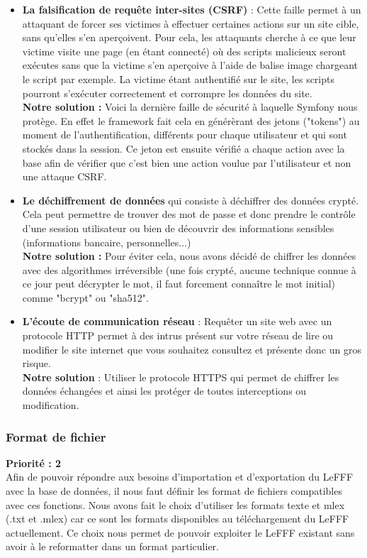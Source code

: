 \documentclass[12pt,a4paper]{article}
\begin{document}
\begin{itemize}
    \item \textbf{La falsification de requête inter-sites (CSRF)} : Cette faille permet à un attaquant de forcer ses victimes à effectuer certaines actions sur un site cible, sans qu'elles s'en aperçoivent. Pour cela, les attaquants cherche à ce que leur victime visite une page (en étant connecté) où des scripts malicieux seront exécutes sans que la victime s'en aperçoive à l'aide de balise image chargeant le script par exemple. La victime étant authentifié sur le site, les scripts pourront s'exécuter correctement et corrompre les données du site. \\
    \textbf{Notre solution :} Voici la dernière faille de sécurité à laquelle Symfony nous protège. En effet le framework fait cela en générèrant des jetons ("tokens") au moment de l'authentification, différents pour chaque utilisateur et qui sont stockés dans la session. Ce jeton est ensuite vérifié a chaque action avec la base afin de vérifier que c'est bien une action voulue par l'utilisateur et non une attaque CSRF. 
    \item \textbf{Le déchiffrement de données} qui consiste à déchiffrer des données crypté. Cela peut permettre de trouver des mot de passe et donc prendre le contrôle d'une session utilisateur ou bien de découvrir des informations sensibles (informations bancaire, personnelles...) \\
    \textbf{Notre solution :} Pour éviter cela, nous avons décidé de chiffrer les données avec des algorithmes irréversible (une fois crypté, aucune technique connue à ce jour peut décrypter le mot, il faut forcement connaître le mot initial) comme "bcrypt" ou "sha512".

    \item \textbf{L'écoute de communication réseau} : Requêter un site web avec un protocole HTTP permet à des intrus présent sur votre réseau de lire ou modifier le site internet que vous souhaitez consultez et présente donc un gros risque. \\
    \textbf{Notre solution} : Utiliser le protocole HTTPS qui permet de chiffrer les données échangées et ainsi les protéger de toutes interceptions ou modification.
\end{itemize}

\subsubsection{Format de fichier}
\textbf{Priorité : 2} \\
Afin de pouvoir répondre aux besoins d'importation et d'exportation du LeFFF avec la base de données, il nous faut définir les format de fichiers compatibles avec ces fonctions.
Nous avons fait le choix d'utiliser les formats texte et mlex (.txt et .mlex)  car ce sont les formats disponibles au téléchargement du LeFFF actuellement. Ce choix nous permet de pouvoir exploiter le LeFFF existant sans avoir à le reformatter dans un format particulier.
\end{document}
